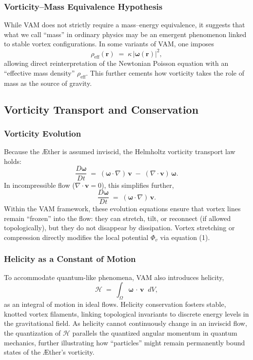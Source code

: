 \documentclass[aps,preprint,superscriptaddress]{revtex4-2}
\begin{document}
    \subsubsection{Vorticity–Mass Equivalence Hypothesis}

    While VAM does not strictly require a mass–energy equivalence, it suggests that what we call “mass” in ordinary physics may be an emergent phenomenon linked to stable vortex configurations. In some variants of VAM, one imposes
    \[
        \rho_{\mathrm{eff}}(\mathbf{r}) \;=\; \kappa \,\lvert \boldsymbol{\omega}(\mathbf{r}) \rvert^2,
    \]
    allowing direct reinterpretation of the Newtonian Poisson equation with an “effective mass density” \(\rho_{\mathrm{eff}}\). This further cements how vorticity takes the role of mass as the source of gravity.

    \subsection{Vorticity Transport and Conservation}

    \subsubsection{Vorticity Evolution}

    Because the Æther is assumed inviscid, the Helmholtz vorticity transport law holds:
    \[
        \frac{D \boldsymbol{\omega}}{Dt}
        \;=\;
        (\boldsymbol{\omega} \cdot \nabla)\,\mathbf{v}
        \;-\;
        (\nabla \cdot \mathbf{v})\,\boldsymbol{\omega}.
    \]
    In incompressible flow (\(\nabla \cdot \mathbf{v} = 0\)), this simplifies further,
    \[
        \frac{D \boldsymbol{\omega}}{Dt}
        \;=\;
        (\boldsymbol{\omega} \cdot \nabla)\,\mathbf{v}.
    \]
    Within the VAM framework, these evolution equations ensure that vortex lines remain “frozen” into the flow: they can stretch, tilt, or reconnect (if allowed topologically), but they do not disappear by dissipation. Vortex stretching or compression directly modifies the local potential \(\Phi_v\) via equation (1).

    \subsubsection{Helicity as a Constant of Motion}

    To accommodate quantum-like phenomena, VAM also introduces helicity,
    \[
        \mathcal{H} \;=\; \int_{\Omega} \boldsymbol{\omega} \,\cdot\, \mathbf{v} \;\;dV,
    \]
    as an integral of motion in ideal flows. Helicity conservation fosters stable, knotted vortex filaments, linking topological invariants to discrete energy levels in the gravitational field. As helicity cannot continuously change in an inviscid flow, the quantization of \(\mathcal{H}\) parallels the quantized angular momentum in quantum mechanics, further illustrating how “particles” might remain permanently bound states of the Æther’s vorticity.
\end{document}

